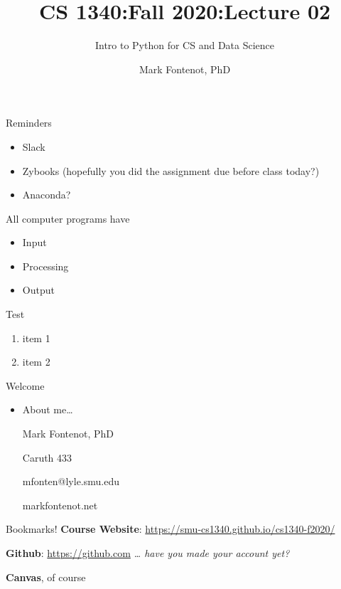 \documentclass[
  11pt,
  ignorenonframetext,
]{beamer}
\title{CS 1340:Fall 2020:Lecture 02}
\subtitle{Intro to Python for CS and Data Science}
\author{Mark Fontenot, PhD}
\date{}
\institute{Southern Methodist University}
\providecommand{\tightlist}{%
  \setlength{\itemsep}{0pt}\setlength{\parskip}{0pt}}
\begin{document}
\frame{\titlepage}

\begin{frame}{Reminders}
\protect\hypertarget{reminders}{}
\begin{itemize}
\tightlist
\item
  Slack
\item
  Zybooks (hopefully you did the assignment due before class today?)
\item
  Anaconda?
\end{itemize}
\end{frame}

\begin{frame}{All computer programs have}
\protect\hypertarget{all-computer-programs-have}{}
\begin{itemize}
\tightlist
\item
  Input
\item
  Processing
\item
  Output
\end{itemize}
\end{frame}

\begin{frame}{Test}
\protect\hypertarget{test}{}
\begin{enumerate}
\tightlist
\item
  item 1
\item
  item 2
\end{enumerate}
\end{frame}

\begin{frame}{Welcome}
\protect\hypertarget{welcome}{}
\begin{itemize}
\item
  About me\ldots{}

  Mark Fontenot, PhD

  Caruth 433

  mfonten@lyle.smu.edu

  markfontenot.net
\end{itemize}
\end{frame}

\begin{frame}{Bookmarks!}
\protect\hypertarget{bookmarks}{}
\textbf{Course Website}:
\url{https://smu-cs1340.github.io/cs1340-f2020/}

\textbf{Github}: \url{https://github.com} \emph{\ldots{} have you made
your account yet?}

\textbf{Canvas}, of course
\end{frame}
\end{document}
